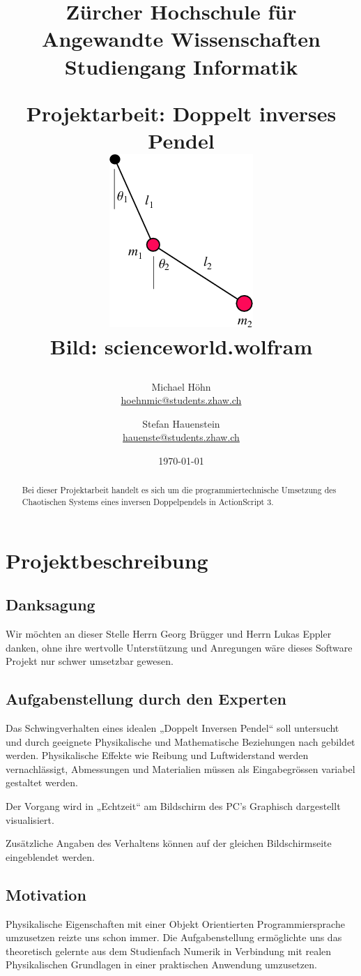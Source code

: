 \documentclass[12pt]{article}
\title{\vspace{-1cm}\linespread{1}\begin{flushleft}\normalsize{Zürcher Hochschule für Angewandte Wissenschaften\\Studiengang Informatik\\}\end{flushleft}\vspace{2cm}\Large{Projektarbeit: Doppelt inverses Pendel}\\\vspace{2cm} \includegraphics[scale=1]{title.png}\\\tiny{Bild: scienceworld.wolfram }}
\author{Michael Höhn\\\href{mailto:hoehnmic@students.zhaw.ch}{hoehnmic@students.zhaw.ch} \and Stefan Hauenstein\\\href{mailto:hauenste@students.zhaw.ch}{hauenste@students.zhaw.ch}}
\date{\today}
\numberwithin{equation}{subsection}
\begin{document}
\maketitle\thispagestyle{empty}

\newpage

\begin{abstract}
Bei dieser Projektarbeit handelt es sich um die programmiertechnische Umsetzung des Chaotischen Systems eines inversen Doppelpendels in ActionScript 3.
\end{abstract}
\newpage

\tableofcontents
\newpage

\section{Projektbeschreibung}
\subsection{Danksagung}
Wir möchten an dieser Stelle Herrn Georg Brügger und Herrn Lukas Eppler danken, ohne ihre wertvolle Unterstützung und Anregungen wäre dieses Software Projekt nur schwer umsetzbar gewesen.

\subsection{Aufgabenstellung durch den Experten}
Das Schwingverhalten eines idealen „Doppelt Inversen Pendel“ soll untersucht und durch geeignete Physikalische und Mathematische Beziehungen nach gebildet werden. Physikalische Effekte wie Reibung und Luftwiderstand werden vernachlässigt, Abmessungen und Materialien müssen als Eingabegrössen variabel gestaltet werden.

Der Vorgang wird in „Echtzeit“ am Bildschirm des PC's Graphisch dargestellt visualisiert.

Zusätzliche Angaben des Verhaltens können auf der gleichen Bildschirmseite eingeblendet werden.

\subsection{Motivation}
Physikalische Eigenschaften mit einer Objekt Orientierten Programmiersprache umzusetzen reizte uns schon immer. Die  Aufgabenstellung ermöglichte uns das theoretisch gelernte aus dem Studienfach Numerik in Verbindung mit realen Physikalischen Grundlagen in einer praktischen Anwendung umzusetzen.
\end{document}
